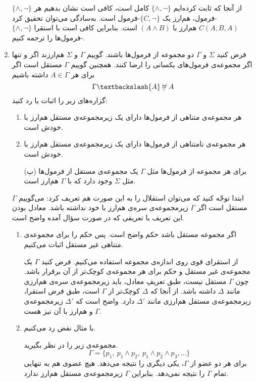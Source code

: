 \documentclass[12pt, 14paper]{article}
\begin{document}
\begin{enumerate}
\begin{ans}
  از آنجا که ثابت کرده‌ایم
  $\{\wedge,\neg\}$
  کامل است، کافی است نشان بدهیم هر $\{\wedge,\neg\}$-فرمول، هم‌ارز یک $\{C,\neg\}$-فرمول است. به‌سادگی می‌توان تحقیق کرد
  $C(A,B,A)$
  هم‌ارز با
  $(A\wedge B)$
  است. بنابراین کافی است با استقرا $\{\wedge,\neg\}$-فرمول‌ها را ترجمه کنیم.
\end{ans}

\item
فرض کنید $\Sigma$ و $\Gamma$ دو مجموعه از فرمول‌ها باشند. گوییم $\Gamma$ و $\Sigma$ هم‌ارزند اگر و تنها اگر مجموعه‌ی فرمول‌های یکسانی را ارضا کنند. همچنین گوییم $\Gamma$ مستقل است اگر برای هر $A\in\Gamma$ داشته باشیم
$$
\Gamma\textbackslash\{A\}\not\vDash A
$$
گزاره‌های زیر را اثبات یا رد کنید:
\begin{enumerate}
\item
هر مجموعه‌ی متناهی از فرمول‌ها دارای یک زیرمجموعه‌ی مستقل هم‌ارز با خودش است.
\item
هر مجموعه‌ی نامتناهی از فرمول‌ها دارای یک زیرمجموعه‌ی مستقل هم‌ارز با خودش است.
\item[(پ)]
برای هر مجموعه از فرمول‌ها مثل $\Gamma$ یک مجموعه‌ی مستقل از فرمول‌ها مثل $\Sigma$ وجود دارد که با $\Gamma$ هم‌ارز است.
\end{enumerate}\quad\vspace{-9mm}
\begin{ans}
  ابتدا توجّه کنید که می‌توان استقلال را به این صورت هم تعریف کرد: می‌گوییم $\Gamma$ مستقل است اگر $\Gamma$ زیرمجموعه‌ی سره‌ی هم‌ارز با خود نداشته باشد. معادل بودن این تعریف با تعریفی که در صورت سؤال آمده واضح است.
  \begin{enumerate}
    \item
    اگر مجموعه مستقل باشد حکم واضح است. پس حکم را برای مجموعه‌ی متناهی غیر مستقل اثبات می‌کنیم.

    از استقرای قوی روی اندازه‌ی مجموعه استفاده می‌کنیم. فرض کنید $\Gamma$ یک مجموعه‌ی غیر مستقل و حکم برای هر مجموعه‌ی کوچک‌تر از آن برقرار باشد.
    چون $\Gamma$ مستقل نیست، طبق تعریفِ معادل، باید زیرمجموعه‌ی سره‌ی هم‌ارزی مانند $\Delta$ داشته باشد. از آنجا که $\Delta$ کوچک‌تر از $\Gamma$ است، طبق فرض استقرا، زیرمجموعه‌ی مستقل هم‌ارزی مانند $\Delta'$ دارد. واضح است که $\Delta'$ زیرمجموعه‌ی $\Gamma$ و هم‌ارز با آن نیز هست.

    \item
    با مثال نقض رد می‌کنیم.

    مجموعه‌ی زیر را در نظر بگیرید.
    $$ \Gamma = \{p_1,~ p_1 \wedge p_2,~ p_1 \wedge p_2 \wedge p_3, \dots \} $$
    برای هر دو عضو از $\Gamma$، یکی دیگری را نتیجه می‌دهد. هیچ عضوی هم به تنهایی تمام $\Gamma$ را نتیجه نمی‌دهد. بنابراین $\Gamma$ زیرمجموعه‌ی مستقل هم‌ارز ندارد.


\end{enumerate}
\end{ans}
\end{enumerate}
\end{document}
